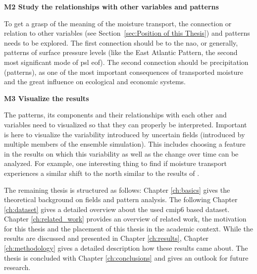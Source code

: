 \textbf{M2 Study the relationships with other variables and patterns}

To get a grasp of the meaning of the moisture transport, the connection or relation to other variables (see Section~\ref{sec:Position of this Thesis}) and patterns needs to be explored. 
The first connection should be to the \ac{nao}, or generally, patterns of surface pressure levels (like the East Atlantic Pattern, the second most significant mode of \ac{psl} \ac{eof}). 
The second connection should be precipitation (patterns), as one of the most important consequences of transported moisture and the great influence on ecological and economic systems. 


\textbf{M3 Visualize the results}

The patterns, its components and their relationships with each other and variables need to visualized so that they can properly be interpreted. 
Important is here  to visualize the variability introduced by uncertain fields (introduced by multiple members of the ensemble simulation).  
This includes choosing a feature in the results on which this variability as well as the change over time can be analyzed. 
For example, one interesting thing to find if moisture transport experiences a similar shift to the north similar to the results of .

\vspace{.3cm}
The remaining thesis is structured as follows: Chapter \ref{ch:basics} gives the theoretical background on fields and pattern analysis. 
The following Chapter \ref{ch:dataset} gives a detailed overview about the used \ac{cmip}6 based dataset. 
Chapter \ref{ch:related_work} provides an overview of related work, the motivation for this thesis and the placement of this thesis in the academic context. 
While the results are discussed and presented in Chapter \ref{ch:results}, Chapter \ref{ch:methodology} gives a detailed description how these results came about. 
The thesis is concluded with Chapter \ref{ch:conclusions} and gives an outlook for future research. 

